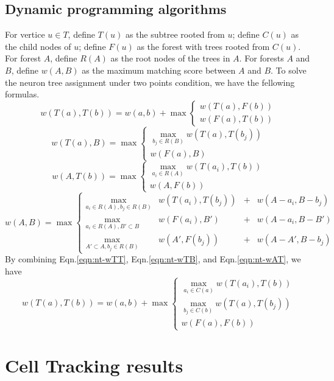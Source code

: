 \subsection{Dynamic programming algorithms}
For vertice $u \in T$, define $T(u)$ as the subtree rooted from $u$; define $C(u)$ as the child nodes of $u$; define $F(u)$ as the forest with trees rooted from $C(u)$. For forest $A$, define $R(A)$ as the root nodes of the trees in $A$. For forests $A$ and $B$, define $w(A,B)$ as the maximum matching score between $A$ and $B$. To solve the neuron tree assignment under two points condition, we have the fellowing formulas.
\begin{equation} \label{eqn:nt-wTT}
w(T(a), T(b)) = w(a,b) + \max\left\{ \begin{array}{l}
                    w(T(a), F(b)) \\
					w(F(a), T(b))
					\end{array} \right.
\end{equation}
\begin{equation}\label{eqn:nt-wTB}
w(T(a), B) = \max\left\{ \begin{array}{l}
                    \max_{b_j \in R(B)}w(T(a), T(b_j)) \\
	                w(F(a), B)
			     \end{array} \right.
\end{equation}
\begin{equation}\label{eqn:nt-wAT}
w(A, T(b)) = \max\left\{ \begin{array}{l}
                  \max_{a_i \in R(A)} w(T(a_i), T(b))\\
				  w(A, F(b))
				  \end{array} \right.
\end{equation}
\begin{equation}
w(A,B) = \max\left\{ \begin{array}{llcl}
			 \max_{a_i \in R(A), b_j \in R(B)} & w(T(a_i), T(b_j)) & + & w(A-a_i, B-b_j) \\
			 \max_{a_i \in R(A), B' \subset B} & w(F(a_i), B') & + & w(A-a_i, B-B') \\
			 \max_{A' \subset A, b_j \in R(B)} & w(A', F(b_j)) & + & w(A-A', B-b_j)
	\end{array} \right.
\end{equation}
By combining Eqn.\ref{eqn:nt-wTT}, Eqn.\ref{eqn:nt-wTB}, and Eqn.\ref{eqn:nt-wAT}, we have
\begin{equation}
w(T(a), T(b)) = w(a,b) + \max\left\{ \begin{array}{l}
                    \max_{a_i \in C(a)} w(T(a_i), T(b)) \\
                    \max_{b_j \in C(b)} w(T(a), T(b_j)) \\
					w(F(a), F(b))
					\end{array} \right.
\end{equation}
\section{Cell Tracking results}
